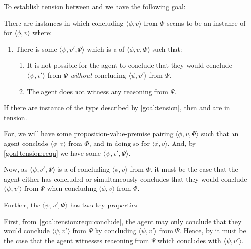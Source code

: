 \begin{note}[Goal]
  To establish tension between \ESU{} and \csN{} we have the following goal:

  \begin{goal}
    \label{goal:tension}
    There are instances in which concluding \(\langle \phi,v \rangle\) from \(\Phi\) seems to be an instance of \csN{} for \(\langle \phi,v \rangle\) where:
    \begin{enumerate}[label=\arabic*., ref=\named{G\ref{goal:tension}:\arabic*}]
    \item
      \label{goal:tension:requ}
      There is some \(\langle \psi,v',\Psi \rangle\) which is a \requ{} of \(\langle \phi,v,\Phi \rangle\) such that:
      \begin{enumerate}[label=\alph*., ref=\named{G\ref{goal:tension}:1\alph*}]
      \item
        \label{goal:tension:requ:conclude}
        It is not possible for the agent to conclude that they would conclude \(\langle \psi,v' \rangle\) from \(\Psi\) \emph{without} concluding \(\langle \psi,v' \rangle\) from \(\Psi\).
      \item
        \label{goal:tension:requ:no-reason}
        The agent does not witness any reasoning from \(\Psi\).
      \end{enumerate}
    \end{enumerate}
    \vspace{-\baselineskip}
  \end{goal}

  If there are instance of the type described by \autoref{goal:tension}, then \ESU{} and \csN{} are in tension.

  For, we will have some proposition-value-premise pairing \(\langle \phi,v,\Phi \rangle\) such that an agent conclude \(\langle \phi,v \rangle\) from \(\Phi\), and in doing so \csV{} for \(\langle \phi,v \rangle\).
  And, by \autoref{goal:tension:requ} we have some \requ{} \(\langle \psi,v',\Psi \rangle\).

  Now, as \(\langle \psi,v',\Psi \rangle\) is a  of concluding \(\langle \phi,v \rangle\) from \(\Phi\), it must be the case that the agent either has concluded or simultaneously concludes that they would conclude \(\langle \psi,v' \rangle\) from \(\Psi\) when concluding \(\langle \phi,v \rangle\) from \(\Phi\).

  Further, the \requ{} \(\langle \psi,v',\Psi \rangle\) has two key properties.

  First, from~\autoref{goal:tension:requ:conclude}, the agent may only conclude that they would conclude \(\langle \psi,v' \rangle\) from \(\Psi\) by concluding \(\langle \psi,v' \rangle\) from \(\Psi\).
  Hence, by \ESU{} it must be the case that the agent witnesses reasoning from \(\Psi\) which concludes with \(\langle \psi,v' \rangle\).


\end{note}
